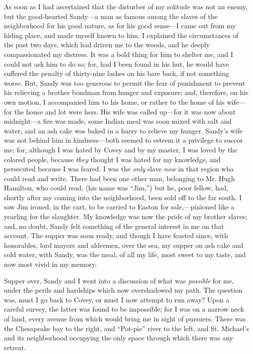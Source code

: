 As soon as I had ascertained that the disturber of my solitude was not
an enemy, but the good-hearted Sandy---a man as famous among the slaves
of the neighborhood for his good nature, as for his good sense---I came
out from my hiding place, and made myself known to him. I explained the
circumstances of the past two days, which had driven me to the woods,
and he deeply compassionated my distress. It was a bold thing for him to
shelter me, and I could not ask him to do so; for, had I been found in
his hut, he would have suffered the penalty of thirty-nine lashes on his
bare back, if not something worse. But,
{\protect\hypertarget{237}{}{}}Sandy was too generous to permit the fear
of punishment to prevent his relieving a brother bondman from hunger and
exposure; and, therefore, on his own motion, I accompanied him to his
home, or rather to the home of his wife---for the house and lot were
hers. His wife was called up---for it was now about midnight---a fire
was made, some Indian meal was soon mixed with salt and water, and an
ash cake was baked in a hurry to relieve my hunger. Sandy's wife was not
behind him in kindness---both seemed to esteem it a privilege to succor
me; for, although I was hated by Covey and by my master, I was loved by
the colored people, because \emph{they} thought I was hated for my
knowledge, and persecuted because I was feared. I was the \emph{only}
slave \emph{now} in that region who could read and write. There had been
one other man, belonging to Mr. Hugh Hamilton, who could read, (his name
was ``Jim,'') but he, poor fellow, had, shortly after my coming into the
neighborhood, been sold off to the far south. I saw Jim ironed, in the
cart, to be carried to Easton for sale,---pinioned like a yearling for
the slaughter. My knowledge was now the pride of my brother slaves; and,
no doubt, Sandy felt something of the general interest in me on that
account. The supper was soon ready, and though I have feasted since,
with honorables, lord mayors and aldermen, over the sea, my supper on
ash cake and cold water, with Sandy, was the meal, of all my life, most
sweet to my taste, and now most vivid in my memory.

Supper over, Sandy and I went into a discussion of what was
\emph{possible} for me, under the perils and
{\protect\hypertarget{238}{}{}}hardships which now overshadowed my path.
The question was, must I go back to Covey, or must I now attempt to run
away? Upon a careful survey, the latter was found to be impossible; for
I was on a narrow neck of land, every avenue from which would bring me
in sight of pursuers. There was the Chesapeake bay to the right, and
``Pot-pie'' river to the left, and St. Michael's and its neighborhood
occupying the only space through which there was any retreat.

